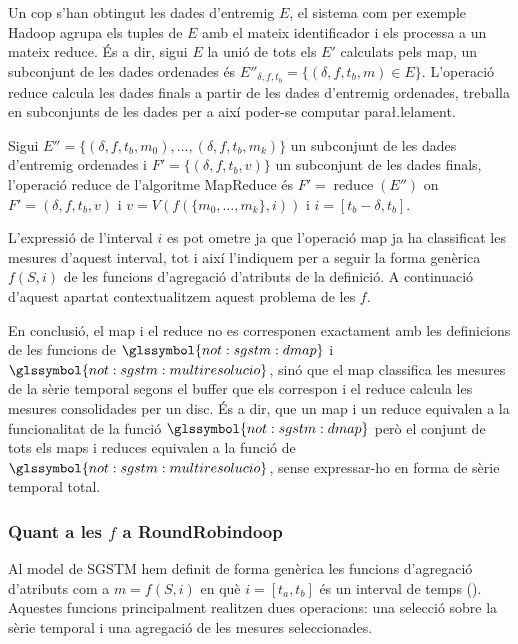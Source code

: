 Un cop s'han obtingut les dades d'entremig $E$, el sistema com per
exemple Hadoop agrupa els tuples de $E$ amb el mateix identificador i
els processa a un mateix reduce. És a dir, sigui $E$ la unió de tots
els $E'$ calculats pels map, un subconjunt de les dades ordenades és
$E''_{\delta,f,t_b} = \{ (\delta,f,t_b,m) \in E \}$.  L'operació
reduce calcula les dades finals a partir de les dades d'entremig
ordenades, treballa en subconjunts de les dades per a així poder-se
computar para\l.lelament.
\begin{definition}
  Sigui $E''= \{ (\delta,f,t_b,m_0) ,\dotsc, (\delta,f,t_b,m_k) \}$ un
  subconjunt de les dades d'entremig ordenades i $F'=\{
  (\delta,f,t_b,v) \}$ un subconjunt de les dades finals, l'operació
  reduce de l'algoritme MapReduce és $F'=\operatorname{reduce}(E'')$
  on $F'= (\delta,f,t_b,v)$ i $v= V( f(\{m_0,\dotsc,m_k\},i))$ i
  $i=[t_b-\delta,t_b]$.
\end{definition}

L'expressió de l'interval $i$ es pot ometre ja que l'operació map ja
ha classificat les mesures d'aquest interval, tot i així l'indiquem
per a seguir la forma genèrica $f(S,i)$ de les funcions d'agregació
d'atributs de la definició. A continuació d'aquest apartat
contextualitzem aquest problema de les $f$.


En conclusió, el map i el reduce no es corresponen exactament
amb les definicions de les funcions de $\glssymbol{not:sgstm:dmap}$ i
$\glssymbol{not:sgstm:multiresolucio}$, sinó
que el map classifica les mesures de la sèrie temporal segons el
buffer que els correspon i el reduce calcula les mesures consolidades
per un disc. És a dir, que un map i un reduce equivalen a la
funcionalitat de la funció $\glssymbol{not:sgstm:dmap}$ però el
conjunt de tots els maps i reduces equivalen a la funció de
$\glssymbol{not:sgstm:multiresolucio}$, sense expressar-ho en forma de
sèrie temporal total.



\subsubsection{Quant a les $f$ a RoundRobindoop}
\label{sec:mapreduce:f}

Al model de \gls{SGSTM} hem definit de forma genèrica les funcions
d'agregació d'atributs com a $m=f(S,i)$ en què $i=[t_a,t_b]$ és un
interval de temps (). Aquestes funcions
principalment realitzen dues operacions: una selecció sobre la sèrie
temporal i una agregació de les mesures seleccionades.

